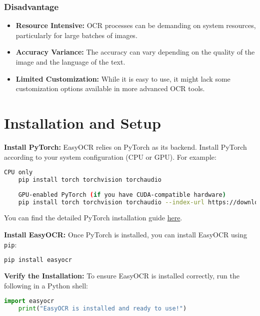 \subsubsection{Disadvantage}
\begin{itemize}
	\item \textbf{Resource Intensive:} OCR processes can be demanding on system resources, particularly for large batches of images.
	\item \textbf{Accuracy Variance:} The accuracy can vary depending on the quality of the image and the language of the text.
	\item \textbf{Limited Customization:} While it is easy to use, it might lack some customization options available in more advanced OCR tools.\cite{Glintecoeasyocr:2023}
\end{itemize}

\section{Installation and Setup}
\textbf{Install PyTorch:} EasyOCR relies on PyTorch as its backend. Install PyTorch according to your system configuration (CPU or GPU). \cite{Mahajan:2023}For example:

\begin{lstlisting}[language=bash, caption=Installing PyTorch]
	CPU only
	pip install torch torchvision torchaudio
	
	GPU-enabled PyTorch (if you have CUDA-compatible hardware)
	pip install torch torchvision torchaudio --index-url https://download.pytorch.org/whl/cu118
\end{lstlisting}

You can find the detailed PyTorch installation guide \href{https://pytorch.org/get-started/locally/}{here}.

\textbf{Install EasyOCR:} Once PyTorch is installed, you can install EasyOCR using \texttt{pip}:

\begin{lstlisting}[language=bash, caption=Installing EasyOCR]
	pip install easyocr
\end{lstlisting}

\textbf{Verify the Installation:} To ensure EasyOCR is installed correctly, run the following in a Python shell:

\begin{lstlisting}[language=Python, caption=Verifying EasyOCR Installation]
	import easyocr
	print("EasyOCR is installed and ready to use!")
\end{lstlisting}

